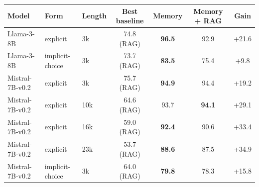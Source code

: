 \begin{tabular}{lll|c|cc|c}
\toprule
Model & Form & Length & Best baseline & Memory & Memory + RAG & Gain \\
\midrule
Llama-3-8B & explicit & 3k & 74.8 (RAG) & \textbf{96.5} & 92.9 & +21.6 \\
Llama-3-8B & implicit-choice & 3k & 73.7 (RAG) & \textbf{83.5} & 75.4 & +9.8 \\
Mistral-7B-v0.2 & explicit & 3k & 75.7 (RAG) & \textbf{94.9} & 94.4 & +19.2 \\
Mistral-7B-v0.2 & explicit & 10k & 64.6 (RAG) & 93.7 & \textbf{94.1} & +29.1 \\
Mistral-7B-v0.2 & explicit & 16k & 59.0 (RAG) & \textbf{92.4} & 90.6 & +33.4 \\
Mistral-7B-v0.2 & explicit & 23k & 53.7 (RAG) & \textbf{88.6} & 87.5 & +34.9 \\
Mistral-7B-v0.2 & implicit-choice & 3k & 64.0 (RAG) & \textbf{79.8} & 78.3 & +15.8 \\
\bottomrule
\end{tabular}

